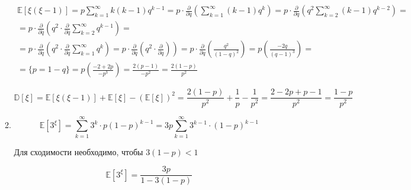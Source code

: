 \begin{solution}
\begin{enumerate}
\begin{enumerate}
		$$
		\begin{aligned} \mathbb{E}[\xi(\xi-1)] = p \sum_{k=1}^{\infty} k(k-1) q^{k-1}=p \cdot \frac{\partial}{\partial q}\left(\sum_{k=1}^{\infty}(k-1) q^{k}\right)=p \cdot \frac{\partial}{\partial q}\left(q^{2} \sum_{k=2}^{\infty}(k-1) q^{k-2}\right)=\\=p \cdot \frac{\partial}{\partial q}\left(q^{2} \cdot \frac{\partial}{\partial q} \sum_{k=2}^{\infty} q^{k-1}\right)=\\\left.=p \cdot \frac{\partial}{\partial q}\left(q^{2} \cdot \frac{\partial}{\partial q} \sum_{k=1}^{\infty} q^{k}\right)=p \cdot \frac{\partial}{\partial q}\left(q^{2} \cdot \frac{\partial}{\partial q}\right)\right)=p \cdot \frac{\partial}{\partial q}\left(\frac{q^{2}}{(1-q)^{2}}\right)=p\left(\frac{-2 q}{(q-1)^{3}}\right)=\\=\{p=1-q\}=p\left(\frac{-2+2 p}{-p^{3}}\right)=\frac{2(p-1)}{-p^{2}}=\frac{2(1-p)}{p^{2}} \end{aligned}
		$$
		
		$$\mathbb{D}[\xi]=\mathbb{E}[\xi(\xi-1)]+\mathbb{E}[\xi]-(\mathbb{E}[\xi])^{2}=\frac{2(1-p)}{p^{2}}+\frac{1}{p}-\frac{1}{p^{2}}=\frac{2-2 p+p-1}{p^{2}}=\frac{1-p}{p^{2}}
		$$
		
		\item 
	
		$$\mathbb{E}\left[3^{\xi}\right]=\sum_{k=1}^{\infty} 3^{k} \cdot p(1-p)^{k-1}=3 p \sum_{k=1}^{\infty} 3^{k-1} \cdot(1-p)^{k-1}$$
		
		Для сходимости необходимо, чтобы $3(1-p)<1$
		
		$$
		\mathbb{E}\left[3^{\xi}\right]=\frac{3 p}{1-3(1-p)}
		$$
	\end{enumerate}

	\end{enumerate}
\end{solution}